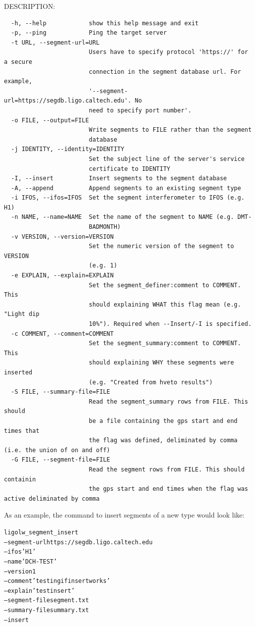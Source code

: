 DESCRIPTION:
\begin{verbatim}
  -h, --help            show this help message and exit
  -p, --ping            Ping the target server
  -t URL, --segment-url=URL
                        Users have to specify protocol 'https://' for a secure
                        connection in the segment database url. For example,
                        '--segment-url=https://segdb.ligo.caltech.edu'. No
                        need to specify port number'.
  -o FILE, --output=FILE
                        Write segments to FILE rather than the segment
                        database
  -j IDENTITY, --identity=IDENTITY
                        Set the subject line of the server's service
                        certificate to IDENTITY
  -I, --insert          Insert segments to the segment database
  -A, --append          Append segments to an existing segment type
  -i IFOS, --ifos=IFOS  Set the segment interferometer to IFOS (e.g. H1)
  -n NAME, --name=NAME  Set the name of the segment to NAME (e.g. DMT-
                        BADMONTH)
  -v VERSION, --version=VERSION
                        Set the numeric version of the segment to VERSION
                        (e.g. 1)
  -e EXPLAIN, --explain=EXPLAIN
                        Set the segment_definer:comment to COMMENT. This
                        should explaining WHAT this flag mean (e.g. "Light dip
                        10%"). Required when --Insert/-I is specified.
  -c COMMENT, --comment=COMMENT
                        Set the segment_summary:comment to COMMENT. This
                        should explaining WHY these segments were inserted
                        (e.g. "Created from hveto results")
  -S FILE, --summary-file=FILE
                        Read the segment_summary rows from FILE. This should
                        be a file containing the gps start and end times that
                        the flag was defined, deliminated by comma (i.e. the union of on and off)
  -G FILE, --segment-file=FILE
                        Read the segment rows from FILE. This should containin
                        the gps start and end times when the flag was active deliminated by comma
\end{verbatim}

As an example, the command to insert segments of a new type would 
look like:

\begin{alltt}
ligolw\_segment\_insert
  --segment-url https://segdb.ligo.caltech.edu
  --ifos 'H1'
  --name 'DCH-TEST'
  --version 1
  --comment 'testing if insert works'
  --explain 'test insert'
  --segment-file segment.txt
  --summary-file summary.txt
  --insert
\end{alltt}

